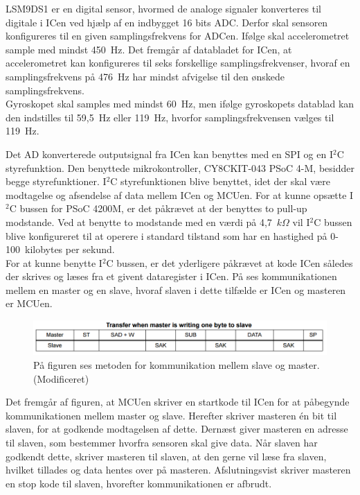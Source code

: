 LSM9DS1 er en digital sensor, hvormed de analoge signaler konverteres til digitale i ICen ved hjælp af en indbygget 16 bits ADC. Derfor skal sensoren konfigureres til en given samplingsfrekvens for ADCen. Ifølge  skal accelerometret sample med mindst 450~Hz. Det fremgår af databladet for ICen, at accelerometret kan konfigureres til seks forskellige samplingsfrekvenser, hvoraf en samplingsfrekvens på 476~Hz har mindst afvigelse til den ønskede samplingsfrekvens. \\
Gyroskopet skal samples med mindst 60~Hz, men ifølge gyroskopets datablad kan den indstilles til 59,5~Hz eller 119~Hz, hvorfor samplingsfrekvensen vælges til 119~Hz.

Det AD konverterede outputsignal fra ICen kan benyttes med en SPI og en I$^{2}$C styrefunktion. Den benyttede mikrokontroller, CY8CKIT-043 PSoC 4-M, besidder begge styrefunktioner. I$^{2}$C styrefunktionen blive benyttet, idet der skal være modtagelse og afsendelse af data mellem ICen og MCUen. For at kunne opsætte I$^{2}$C bussen for PSoC 4200M, er det påkrævet at der benyttes to pull-up modstande. Ved at benytte to modstande med en værdi på 4,7~$k\Omega$ vil I$^{2}$C bussen blive konfigureret til at operere i standard tilstand som har en hastighed på 0-100~kilobytes per sekund. \citep{CYPRESS2016} \\
For at kunne benytte I$^{2}$C bussen, er det yderligere påkrævet at kode ICen således der skrives og læses fra et givent dataregister i ICen. På  ses kommunikationen mellem en master og en slave, hvoraf slaven i dette tilfælde er ICen og masteren er MCUen. 
\begin{figure}[H]
	\centering
	\includegraphics[scale=0.75]{figures/cDesign/Sensor_write_read2.png}
	\caption{På figuren ses metoden for kommunikation mellem slave og master. \citep{STMicroelectronics2016} (Modificeret)}
	\label{Fig:master_slave}
\end{figure}
Det fremgår af figuren, at MCUen skriver en startkode til ICen for at påbegynde kommunikationen mellem master og slave. Herefter skriver masteren én bit til slaven, for at godkende modtagelsen af dette. Dernæst giver masteren en adresse til slaven, som bestemmer hvorfra sensoren skal give data. Når slaven har godkendt dette, skriver masteren til slaven, at den gerne vil læse fra slaven, hvilket tillades og data hentes over på masteren. Afslutningsvist skriver masteren en stop kode til slaven, hvorefter kommunikationen er afbrudt. %

